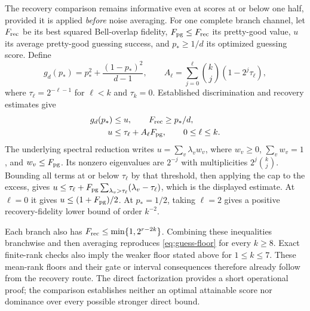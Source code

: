 \documentclass[11pt,a4paper]{article}
\numberwithin{equation}{section}
\theoremstyle{remark}\newtheorem*{remark}{Interpretation}
\begin{document}
The recovery comparison remains informative even at scores at or below one half, provided it is applied \emph{before} noise averaging. For one complete branch channel, let $F_{\rm rec}$ be its best squared Bell-overlap fidelity, $F_{\rm pg}\le F_{\rm rec}$ its pretty-good value, $u$ its average pretty-good guessing success, and $p_*\ge1/d$ its optimized guessing score. Define
\[
g_d(p_*)=p_*^2+\frac{(1-p_*)^2}{d-1},\qquad
A_\ell=\sum_{j=0}^{\ell}\binom kj(1-2^j\tau_\ell),
\]
where $\tau_\ell=2^{-\ell-1}$ for $\ell<k$ and $\tau_k=0$. Established discrimination and recovery estimates give
\begin{align}
g_d(p_*)&\le u,\qquad F_{\rm rec}\ge p_*/d,\notag\\
u&\le\tau_\ell+A_\ell F_{\rm pg},\qquad 0\le\ell\le k.
\label{eq:guess-recovery}
\end{align}
The underlying spectral reduction writes $u=\sum_v\lambda_vw_v$, where $w_v\ge0$, $\sum_vw_v=1$, and $w_v\le F_{\rm pg}$. Its nonzero eigenvalues are $2^{-j}$ with multiplicities $2^j\binom kj$. Bounding all terms at or below $\tau_\ell$ by that threshold, then applying the cap to the excess, gives $u\le\tau_\ell+F_{\rm pg}\sum_{\lambda_v>\tau_\ell}(\lambda_v-\tau_\ell)$, which is the displayed estimate. At $\ell=0$ it gives $u\le(1+F_{\rm pg})/2$. At $p_*=1/2$, taking $\ell=2$ gives a positive recovery-fidelity lower bound of order $k^{-2}$.

Each branch also has $F_{\rm rec}\le\min\{1,2^{r-2k}\}$. Combining these inequalities branchwise and then averaging reproduces \eqref{eq:guess-floor} for every $k\ge8$. Exact finite-rank checks also imply the weaker floor stated above for $1\le k\le7$. These mean-rank floors and their gate or interval consequences therefore already follow from the recovery route. The direct factorization provides a short operational proof; the comparison establishes neither an optimal attainable score nor dominance over every possible stronger direct bound.
\end{document}
